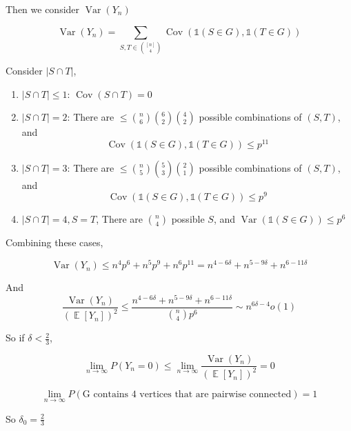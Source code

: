 \documentclass{article}
\DeclareMathOperator{\E}{\mathbb{E}}
\DeclareMathOperator{\Var}{\operatorname{Var}}
\DeclareMathOperator{\Cov}{\operatorname{Cov}}
\begin{document}
Then we consider $\Var(Y_n)$

\begin{equation}
    \Var \left(Y_{n}\right)=\sum_{S,T \in \binom{[n]}{4}} \Cov (\mathds{1}(S \in G), \mathds{1}(T \in G))
\end{equation}

Consider $|S\cap T|$, \begin{enumerate}
    \item $|S\cap T| \leqslant 1$: $\Cov(S\cap T) = 0$
    \item $|S\cap T| = 2$: There are $\leqslant \binom{n}{6} \binom{6}{2} \binom{4}{2}$ possible combinations of $(S,T)$, and $$\Cov (\mathds{1}(S \in G), \mathds{1}(T \in G)) \leqslant p^{11}$$
    \item $|S\cap T| = 3$: There are $\leqslant \binom{n}{5} \binom{5}{3} \binom{2}{1}$ possible combinations of $(S,T)$, and $$\Cov (\mathds{1}(S \in G), \mathds{1}(T \in G)) \leqslant p^{9}$$
    \item $|S\cap T| = 4,S=T$, There are $ \binom{n}{4} $ possible $S$, and $\Var(\mathds{1}(S \in G)) \leqslant p^6$
\end{enumerate}

Combining these cases,

\begin{equation}
    \Var \left(Y_{n}\right) \leqslant n^4 p^6 + n^5 p^9 + n^6 p ^{11} = n ^{4-6\delta} + n ^{5-9\delta} + n^{6-11\delta}
\end{equation}

And 
\begin{equation}
    \frac{\Var(Y_n)}{ (\E[Y_n])^2} \leqslant \frac{n^{4-6\delta} + n ^{5-9\delta} + n^{6-11\delta}}{ \binom{n}{4} p^6} \sim n^{6\delta - 4} o(1) 
\end{equation}


So if $\delta <\frac{2}{3}$,

\begin{equation}
    \lim_{n\to\infty} P(Y_n = 0) \leqslant \lim_{n\to \infty}  \frac{\Var(Y_n)}{ (\E[Y_n])^2} = 0
\end{equation}

\begin{equation}
    \lim_{n\to\infty} P(\text{G contains 4 vertices that are pairwise connected}) = 1 
\end{equation}

So $\delta_0 = \frac{2}{3}$
\end{document}
